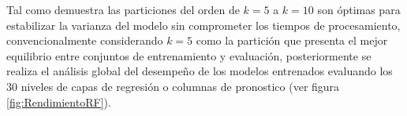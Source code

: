 			
			Tal como demuestra \citet{kohavi1995} las particiones del orden de $k=5$ a $k=10$ son óptimas para estabilizar la varianza del modelo sin comprometer los tiempos de procesamiento, convencionalmente considerando $k=5$ como la partición que presenta el mejor equilibrio entre conjuntos de entrenamiento y evaluación, posteriormente se realiza el análisis global del desempeño de los modelos entrenados evaluando los 30 niveles de capas de regresión o columnas de pronostico (ver figura \ref{fig:RendimientoRF}).
			
			
